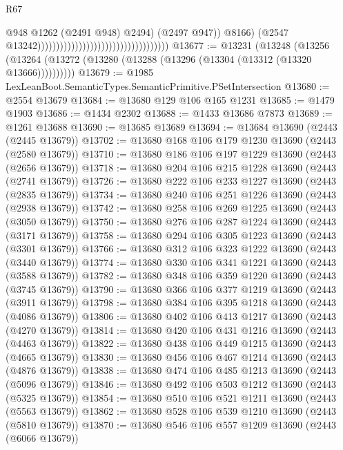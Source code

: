 \begin{lexlean}{R67}
\begin{coremodule}
                                                                              @948
                                                                              @1262
                                                                              (@2491 @948)
                                                                              @2494)
                                                                            (@2497 @947))
                                                                          @8166)
                                                                        (@2547
                                                                          @13242)))))))))))))))))))))))))))))))))))
@13677 := @13231
    (@13248 (@13256 (@13264 (@13272 (@13280 (@13288 (@13296 (@13304 (@13312 (@13320 @13666))))))))))
@13679 := @1985 LexLeanBoot.SemanticTypes.SemanticPrimitive.PSetIntersection
@13680 := @2554 @13679
@13684 := @13680 @129 @106 @165 @1231
@13685 := @1479 @1903
@13686 := @1434 @2302
@13688 := @1433 @13686 @7873
@13689 := @1261 @13688
@13690 := @13685 @13689
@13694 := @13684 @13690 (@2443 (@2445 @13679))
@13702 := @13680 @168 @106 @179 @1230 @13690 (@2443 (@2580 @13679))
@13710 := @13680 @186 @106 @197 @1229 @13690 (@2443 (@2656 @13679))
@13718 := @13680 @204 @106 @215 @1228 @13690 (@2443 (@2741 @13679))
@13726 := @13680 @222 @106 @233 @1227 @13690 (@2443 (@2835 @13679))
@13734 := @13680 @240 @106 @251 @1226 @13690 (@2443 (@2938 @13679))
@13742 := @13680 @258 @106 @269 @1225 @13690 (@2443 (@3050 @13679))
@13750 := @13680 @276 @106 @287 @1224 @13690 (@2443 (@3171 @13679))
@13758 := @13680 @294 @106 @305 @1223 @13690 (@2443 (@3301 @13679))
@13766 := @13680 @312 @106 @323 @1222 @13690 (@2443 (@3440 @13679))
@13774 := @13680 @330 @106 @341 @1221 @13690 (@2443 (@3588 @13679))
@13782 := @13680 @348 @106 @359 @1220 @13690 (@2443 (@3745 @13679))
@13790 := @13680 @366 @106 @377 @1219 @13690 (@2443 (@3911 @13679))
@13798 := @13680 @384 @106 @395 @1218 @13690 (@2443 (@4086 @13679))
@13806 := @13680 @402 @106 @413 @1217 @13690 (@2443 (@4270 @13679))
@13814 := @13680 @420 @106 @431 @1216 @13690 (@2443 (@4463 @13679))
@13822 := @13680 @438 @106 @449 @1215 @13690 (@2443 (@4665 @13679))
@13830 := @13680 @456 @106 @467 @1214 @13690 (@2443 (@4876 @13679))
@13838 := @13680 @474 @106 @485 @1213 @13690 (@2443 (@5096 @13679))
@13846 := @13680 @492 @106 @503 @1212 @13690 (@2443 (@5325 @13679))
@13854 := @13680 @510 @106 @521 @1211 @13690 (@2443 (@5563 @13679))
@13862 := @13680 @528 @106 @539 @1210 @13690 (@2443 (@5810 @13679))
@13870 := @13680 @546 @106 @557 @1209 @13690 (@2443 (@6066 @13679))

\end{coremodule}
\end{lexlean}

